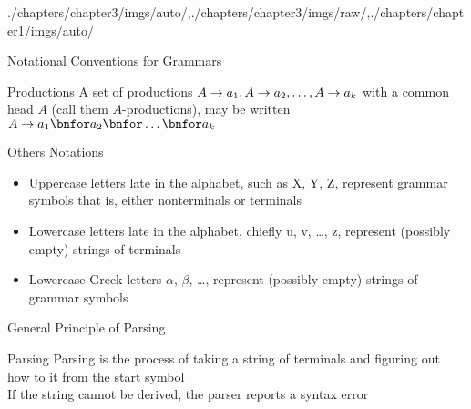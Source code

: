\begin{graphicspathcontext}{{./chapters/chapter3/imgs/auto/},{./chapters/chapter3/imgs/raw/},{./chapters/chapter1/imgs/auto/}}
\begin{bibunit}[apalike]
\begin{frame}{Notational Conventions for Grammars \insertcontinuationtext}
	\begin{block}{Productions}
		A set of productions $A \rightarrow a_1, A \rightarrow a_2, \dots, A \rightarrow a_k$ with a common head $A$ (call them $A$-productions), may be written $A \bnfopo a_1 \bnfor a_2 \bnfor \dots \bnfor a_k$
	\end{block}
	\vspace{1cm}
	\begin{block}{Others Notations}
		\begin{itemize}
			\item Uppercase letters late in the alphabet, such as X, Y, Z, represent grammar symbols that is, either nonterminals or terminals
			\item Lowercase letters late in the alphabet, chiefly u, v, \dots, z, represent (possibly empty) strings of terminals
			\item Lowercase Greek letters $\alpha$, $\beta$, \dots, represent (possibly empty) strings of grammar symbols
		\end{itemize}
	\end{block}
\end{frame}

\begin{frame}{{General Principle} of Parsing}
	\begin{definitionblock}{Parsing}
		Parsing is the process of taking a string of terminals and figuring out how to  it from the start symbol \\
		If the string cannot be derived, the parser reports a syntax error
	\end{definitionblock}
	\vspace{.5cm}
	\begin{rightarrowsequence}
	\end{rightarrowsequence}
\end{frame}


\end{bibunit}
\end{graphicspathcontext}

